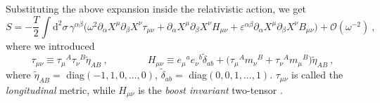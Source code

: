 \documentclass[12pt]{article}
\def\dd{\text{d}}
\numberwithin{equation}{section}
\begin{document}
Substituting the above expansion inside the relativistic action, we get
\begin{equation}
\label{S_NR_div}
S = - \frac{T}{2} \int \dd^2 \sigma \, \gamma^{\alpha\beta} \bigg( \omega^2 \partial_{\alpha} X^{\mu} \partial_{\beta} X^{\nu} \tau_{\mu\nu} + \partial_{\alpha} X^{\mu} \partial_{\beta} X^{\nu} H_{\mu\nu} + \varepsilon^{\alpha\beta}  \partial_{\alpha} X^{\mu} \partial_{\beta} X^{\nu} B_{\mu\nu}\bigg) + \mathcal{O}(\omega^{-2}) \ , 
\end{equation} 
where we introduced 
\begin{equation}
\tau_{\mu\nu} \equiv \tau_{\mu}{}^A \tau_{\nu}{}^B \tilde{\eta}_{AB} \ , \qquad\qquad
H_{\mu\nu} \equiv e_{\mu}{}^a e_{\nu}{}^b \tilde{\delta}_{ab} + \bigg(\tau_{\mu}{}^A m_{\nu}{}^B + \tau_{\nu}{}^A m_{\mu}{}^B \bigg) \tilde{\eta}_{AB} \ , 
\end{equation}
where $\tilde{\eta}_{AB} =$ diag$(-1, 1, 0, ..., 0)$, $\tilde{\delta}_{ab} =$ diag$(0,0,1,...,1)$. $\tau_{\mu\nu}$ is called the \emph{longitudinal} metric, while $H_{\mu\nu}$ is the \emph{boost invariant} two-tensor \cite{Bergshoeff:2018yvt}. 
\end{document}

